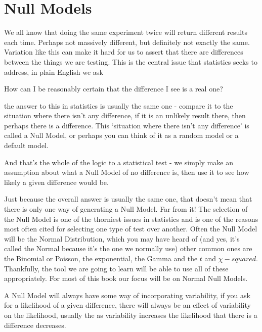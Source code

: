 \documentclass[
]{book}
\newenvironment{myquote}
{\begin{large}
\begin{itshape}
\begin{minipage}{6cm}
}
{
\begin{vspace}{15mm}
\end{vspace}
\end{minipage}
\end{itshape}
\end{large} 
}
\newenvironment{sidenote}
{ \begin{tcolorbox}[colbacktitle=blue!50!white,
title=huh?,coltitle=white,
fonttitle=\bfseries] }
{  \end{tcolorbox} }
\begin{document}
\hypertarget{null-models}{%
\section{Null Models}\label{null-models}}

We all know that doing the same experiment twice will return different results each time. Perhaps not massively different, but definitely not exactly the same. Variation like this can make it hard for us to assert that there are differences between the things we are testing. This is the central issue that statistics seeks to address, in plain English we ask

\begin{myquote}
How can I be reasonably certain that the difference I see is a real one?
\end{myquote}

the answer to this in statistics is usually the same one - compare it to the situation where there isn't any difference, if it is an unlikely result there, then perhaps there is a difference. This `situation where there isn't any difference' is called a Null Model, or perhaps you can think of it as a random model or a default model.

And that's the whole of the logic to a statistical test - we simply make an assumption about what a Null Model of no difference is, then use it to see how likely a given difference would be.

\begin{sidenote}
Just because the overall answer is usually the same one, that doesn't mean that there is only one way of generating a Null Model. Far from it! The selection of the Null Model is one of the thorniest issues in statistics and is one of the reasons most often cited for selecting one type of test over another. Often the Null Model will be the Normal Distribution, which you may have heard of (and yes, it's called the Normal because it's the one we normally use) other common ones are the Binomial or Poisson, the exponential, the Gamma and the \(t\) and \(\chi-squared\). Thankfully, the tool we are going to learn will be able to use all of these appropriately. For most of this book our focus will be on Normal Null Models.
\end{sidenote}

A Null Model will always have some way of incorporating variability, if you ask for a likelihood of a given difference, there will always be an effect of variability on the likelihood, usually the as variability increases the likelihood that there is a difference decreases.
\end{document}
